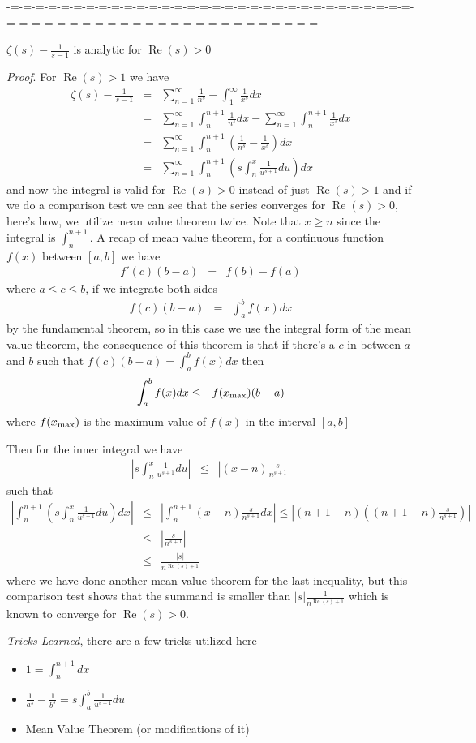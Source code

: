 \documentclass[aps,preprint,preprintnumbers,nofootinbib,showpacs,prd]{revtex4-1}
\newcommand{\bit}{\begin{itemize}}
\newcommand{\eit}{\end{itemize}}
\newcommand{\nbea}{\begin{eqnarray*}}
\newcommand{\neea}{\end{eqnarray*}}
\DeclareMathOperator{\re}{Re}
\begin{document}
-=-=-=-=-=-=-=-=-=-=-=-=-=-=-=-=-=-=-=-=-=-=-=-=-=-=-=-=-=-=-=-=-=-=-=-=-=-=-=-=-=-=-=-=-=-=-=-=-=-=-=-=-=-=-=-=-=-

$\zeta(s) - \frac{1}{s-1}$ is analytic for $\re(s)>0$

{\it Proof}. For $\re(s) > 1$ we have
%
\nbea
\zeta(s) - \frac{1}{s-1} & = & \sum_{n=1}^\infty \frac{1}{n^s} - \int_1^\infty \frac{1}{x^s} dx \\
& = & \sum_{n=1}^\infty \int_n^{n+1}\frac{1}{n^s}dx - \sum_{n=1}^\infty \int_n^{n+1} \frac{1}{x^s} dx \\
& = & \sum_{n=1}^\infty \int_n^{n+1} \left(\frac{1}{n^s} - \frac{1}{x^s} \right )dx \\
& = & \sum_{n=1}^\infty \int_n^{n+1} \left(s\int_n^x \frac{1}{u^{s+1}}du \right )dx
\neea
%
and now the integral is valid for $\re(s)>0$ instead of just $\re(s)>1$ and if we do a comparison test we can see that the series converges for $\re(s)>0$, here's how, we utilize mean value theorem twice. Note that $x \ge n$ since the integral is $\int_n^{n+1}$. A recap of mean value theorem, for a continuous function $f(x)$ between $[a,b]$ we have
%
\nbea
f'(c)(b-a) & = & f(b) - f(a)
\neea
%
where $a\le c \le b$, if we integrate both sides
%
\nbea
f(c)(b-a) & = & \int_a^b f(x) dx
\neea
%
by the fundamental theorem, so in this case we use the integral form of the mean value theorem, the consequence of this theorem is that if there's a $c$ in between $a$ and $b$ such that $f(c)(b-a) = \int_a^b f(x) dx$ then
%
\nbea
\int_a^b f(x) dx & \le & f(x_{\rm max})(b-a)
\neea
%
where $f(x_{\rm max})$ is the maximum value of $f(x)$ in the interval $[a,b]$

Then for the inner integral we have
%
\nbea
\left|s\int_n^x \frac{1}{u^{s+1}}du\right| & \le & \left|(x-n) \frac{s}{n^{s+1}} \right |
\neea
%
such that
%
\nbea
\left| \int_n^{n+1} \left(s\int_n^x \frac{1}{u^{s+1}}du \right )dx \right| & \le & \left|\int_n^{n+1} (x-n) \frac{s}{n^{s+1}} dx\right| \le \left|(n+1-n)\left((n+1-n) \frac{s}{n^{s+1}}\right)\right| \\
& \le & \left|\frac{s}{n^{s+1}}\right| \\
& \le & \frac{|s|}{n^{\re(s)+1}}
\neea
%
where we have done another mean value theorem for the last inequality, but this comparison test shows that the summand is smaller than $|s| \frac{1}{n^{\re(s)+1}}$ which is known to converge for $\re(s) > 0$.

\underline{\textit{Tricks Learned}}, there are a few tricks utilized here
%
\bit
\item $1 = \int_n^{n+1} dx$
\item $\frac{1}{a^s} - \frac{1}{b^s} = s\int_a^b \frac{1}{u^{s+1}}du$
\item Mean Value Theorem (or modifications of it)
\eit
%
\end{document}
